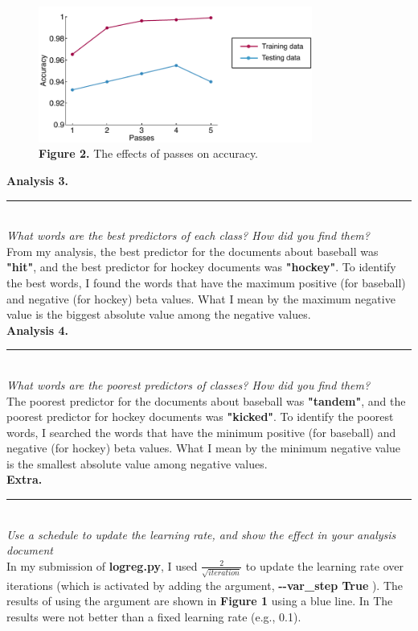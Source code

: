 \documentclass[letterpaper,11pt,notitlepage]{article}
\begin{document}
\begin{figure}[ht!]
	\centering
	\includegraphics[width=9cm]{figure2_axis}
	\captionsetup{width=.8\textwidth}
	\caption{\textbf{Figure 2.} The effects of passes on accuracy.} 
\end{figure}

\hspace*{-1cm}\textbf{Analysis 3.}  \rule{10.5cm}{0.4pt}\\
\noindent\textit{What words are the best predictors of each class? How did you find them?}\\

\noindent From my analysis, the best predictor for the documents about baseball was \textbf{"hit"}, and the best predictor for hockey documents was \textbf{"hockey"}. To identify the best words, I found the words that have the maximum positive (for baseball) and negative (for hockey) beta values. What I mean by the maximum negative value is the biggest absolute value among the negative values.\\ 

\hspace*{-1cm}\textbf{Analysis 4.}  \rule{10.5cm}{0.4pt}\\
\noindent\textit{What words are the poorest predictors of classes? How did you find them?}\\

\noindent The poorest predictor for the documents about baseball was \textbf{"tandem"}, and the poorest predictor for hockey documents was \textbf{"kicked"}. To identify the poorest words, I searched the words that have the minimum positive (for baseball) and negative (for hockey) beta values. What I mean by the minimum negative value is the smallest absolute value among negative values.\\

\hspace*{-1cm}\textbf{Extra.}  \rule{10.5cm}{0.4pt}\\
\noindent\textit{Use a schedule to update the learning rate, and show the effect in your analysis document}\\

\noindent In my submission of \textbf{logreg.py}, I used $\frac{2}{\sqrt{iteration}}$ to update the learning rate over iterations (which is activated by adding the argument, \textbf{\--\--var\_step True}
). The results of using the argument are shown in \textbf{Figure 1} using a blue line. In  The results were not better than a fixed learning rate (e.g., 0.1). 
\end{document}
